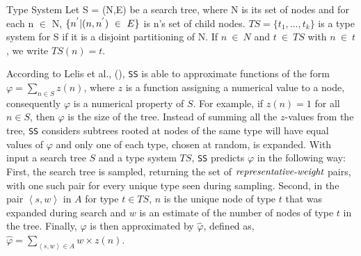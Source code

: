 \begin{definition}{Type System}
Let S = (N,E) be a search tree, where N is its set of nodes and  for each n $\in$ N, $\{n\sp{'}|(n,n\sp{'})\ \in\ E \}$ is n's set of child nodes. $TS = \{t_{1},...,t_{k} \}$ is a type system for S if it is a disjoint partitioning of N. If $n\ \in\ N$ and $t\ \in\ TS$ with $n\ \in\ t$, we write $TS(n) = t$.
\end{definition}


According to Lelis et al., (\citeyear{lelis2013predicting}), \texttt{SS} is able to approximate functions of the form $\varphi = \sum_{n \in S}z(n)$, where $z$ is a function assigning a numerical value to a node, consequently $\varphi$ is a numerical property of $S$. For example, if $z(n)=1$ for all $n \in S$, then $\varphi$ is the size of the tree. Instead of summing all the $z$-values from the tree, \texttt{SS} considers  subtrees rooted at nodes of the same type will have equal values of $\varphi$ and only one of each type, chosen at random, is expanded. With input a search tree $S$ and a type system $TS$, \texttt{SS} predicts $\varphi$ in the following way: First, the search tree is sampled, returning the set of $\emph{representative-weight}$ pairs, with one such pair for every unique type seen during sampling. Second, in the pair $\left\langle s,w \right\rangle$ in $A$ for type $t \in TS$, $n$ is the unique node of type $t$ that was expanded during search and $w$ is an estimate of the number of nodes of type $t$ in the tree. Finally, $\varphi$ is then approximated by $\hat{\varphi}$, defined as, $\hat{\varphi} =  \sum_{\left\langle s,w \right\rangle \in A}w \times z(n)$.

